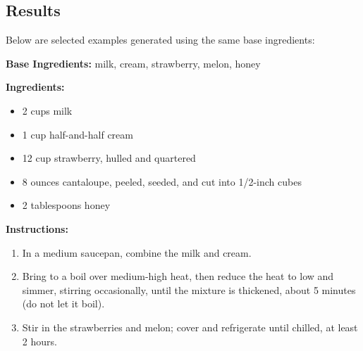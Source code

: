 \subsection{Results}
Below are selected examples generated using the same base ingredients:

\begin{tcolorbox}[recipebox={Melon and Strawberry Ice Cream}]
	\textbf{Base Ingredients:} milk, cream, strawberry, melon, honey

	\vspace{0.5em}
	\textbf{Ingredients:}
	\begin{itemize}
		\item 2 cups milk
		\item 1 cup half-and-half cream
		\item 12 cup strawberry, hulled and quartered
		\item 8 ounces cantaloupe, peeled, seeded, and cut into 1/2-inch cubes
		\item 2 tablespoons honey
	\end{itemize}

	\vspace{0.5em}
	\textbf{Instructions:}
	\begin{enumerate}
		\item In a medium saucepan, combine the milk and cream.
		\item Bring to a boil over medium-high heat, then reduce the heat to low and simmer, stirring occasionally, until the mixture is thickened, about 5 minutes (do not let it boil).
		\item Stir in the strawberries and melon; cover and refrigerate until chilled, at least 2 hours.
	\end{enumerate}
\end{tcolorbox}

